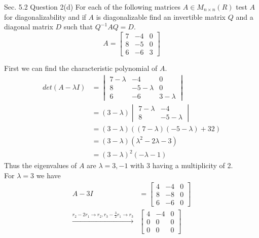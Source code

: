 \documentclass[answers,12pt,addpoints]{exam}
\begin{document}
\begin{questions}
    \question[10] Sec. 5.2 Question 2(d)
    For each of the following matrices $A \in M_{n \times n}(R)$ test $A$ for diagonalizability and if $A$ is diagonalizable find an invertible matrix $Q$ and a diagonal matrix $D$ such that $Q^{-1}AQ = D$.
    $$ A = \begin{bmatrix}
        7 & -4 & 0\\
        8 & -5 & 0\\
        6 & -6 & 3
    \end{bmatrix}$$
    \begin{solution}
        First we can find the characteristic polynomial of $A$.
        \begin{align*}
            det(A - \lambda I) &= \begin{vmatrix}
                7 - \lambda & -4 & 0\\
                8 & -5 - \lambda & 0\\
                6 & -6 & 3 - \lambda
            \end{vmatrix}\\
            &= (3 - \lambda)\begin{vmatrix}
                7 - \lambda & -4\\
                8 & -5 - \lambda
            \end{vmatrix}\\
            &= (3 - \lambda)((7 - \lambda)(-5 - \lambda) + 32)\\
            &= (3 - \lambda)(\lambda^2 - 2\lambda - 3)\\
            &= (3 - \lambda)^2(-\lambda - 1)
        \end{align*}
        Thus the eigenvalues of $A$ are $\lambda = 3, -1$ with 3 having a multiplicity of 2.\\
        For $\lambda = 3$ we have
        \begin{align*}
            A - 3I &= \begin{bmatrix}
                4 & -4 & 0\\
                8 & -8 & 0\\
                6 & -6 & 0
            \end{bmatrix}\\
            \xrightarrow{r_2 - 2r_1 \to r_2, r_3 - \frac{3}{2}r_1 \to r_3} &\begin{bmatrix}
                4 & -4 & 0\\
                0 & 0 & 0\\
                0 & 0 & 0
            \end{bmatrix}

\end{align*}
\end{solution}
\end{questions}
\end{document}
